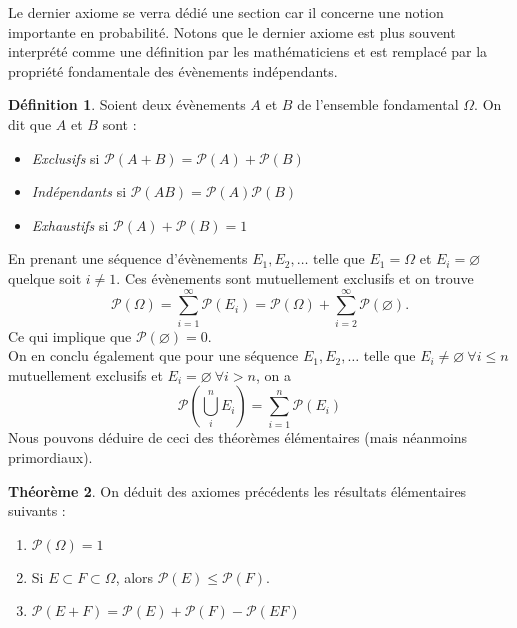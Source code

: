 \documentclass[a4paper,12pt]{report}
\theoremstyle{definition}
\renewcommand{\(}{\left(}
\renewcommand{\)}{\right)}
\renewcommand{\P}{\mathcal{P}}
\renewcommand{\d}{\textit}
\newtheorem{thm}{Théorème}[section]
\newtheorem{defn}[thm]{Définition}
\begin{document}
    Le dernier axiome se verra dédié une section car il concerne une notion importante en probabilité. Notons que le dernier axiome est plus souvent interprété comme une définition par les mathématiciens et est remplacé par la propriété fondamentale des évènements indépendants.
    
    \begin{leftbar}
    \begin{defn}
        Soient deux évènements $A$ et $B$ de l'ensemble fondamental $\Omega$. On dit que $A$ et $B$ sont :
        \begin{itemize}[label = \textbullet]
            \item \d{Exclusifs} si $\P(A+B) = \P(A)+\P(B)$ 
            \item \d{Indépendants} si $\P(AB) = \P(A)\P(B)$
            \item \d{Exhaustifs} si $\P(A)+\P(B) = 1$
        \end{itemize}
    \end{defn}
    \end{leftbar}
    
    En prenant une séquence d'évènements $E_1, E_2, \ldots$ telle que $E_1 = \Omega$ et $E_i = \varnothing$ quelque soit $i \neq 1$. Ces évènements sont mutuellement exclusifs et on trouve 
    $$\P(\Omega) = \sum_{i = 1 }^{\infty} \P(E_i) = \P(\Omega) + \sum_{i = 2}^{\infty}\P(\varnothing).$$
    Ce qui implique que $\P(\varnothing) = 0$.\\
    On en conclu également que pour une séquence $E_1, E_2, \ldots$ telle que $E_i \neq \varnothing~\forall i \le n$ mutuellement exclusifs et $E_i = \varnothing~\forall i > n $, on a 
    $$\P\left(\bigcup_i^n E_i\right) = \sum_{i = 1}^n \P(E_i)$$
    Nous pouvons déduire de ceci des théorèmes élémentaires (mais néanmoins primordiaux).
    
    \begin{leftbar}
    \begin{thm}
        On déduit des axiomes précédents les résultats élémentaires suivants :
        \begin{enumerate}[label = (\roman*)]
            \item $\P(\Omega) = 1$
            \item Si $E \subset F \subset \Omega$, alors $\P(E) \le \P(F)$.
            \item $\P(E + F)  = \P(E) + \P(F) - \P(EF)$
        \end{enumerate}
    \end{thm}
    \end{leftbar}
        
\end{document}
